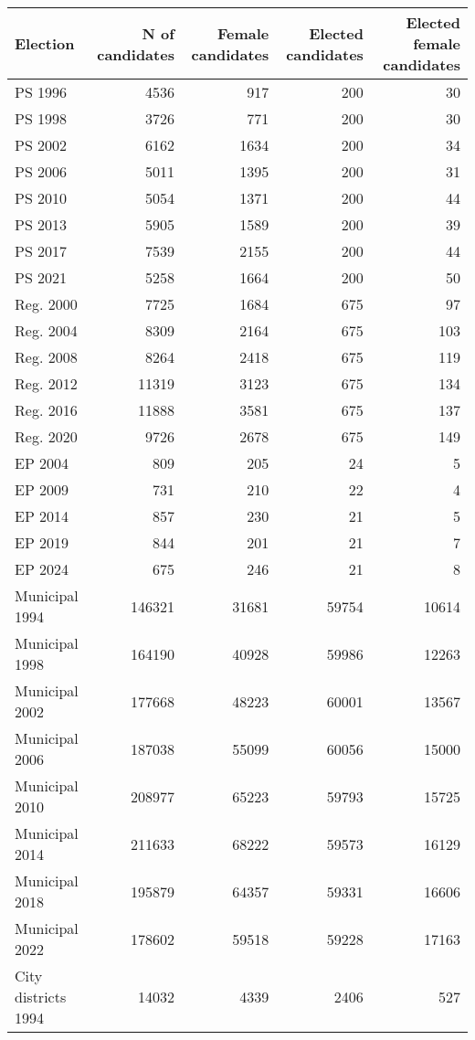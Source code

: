 
\begin{tabular}{l|r|r|r|r}
\hline
Election & N of candidates & Female candidates & Elected candidates & Elected female candidates\\
\hline
PS 1996 & 4536 & 917 & 200 & 30\\
\hline
PS 1998 & 3726 & 771 & 200 & 30\\
\hline
PS 2002 & 6162 & 1634 & 200 & 34\\
\hline
PS 2006 & 5011 & 1395 & 200 & 31\\
\hline
PS 2010 & 5054 & 1371 & 200 & 44\\
\hline
PS 2013 & 5905 & 1589 & 200 & 39\\
\hline
PS 2017 & 7539 & 2155 & 200 & 44\\
\hline
PS 2021 & 5258 & 1664 & 200 & 50\\
\hline
Reg. 2000 & 7725 & 1684 & 675 & 97\\
\hline
Reg. 2004 & 8309 & 2164 & 675 & 103\\
\hline
Reg. 2008 & 8264 & 2418 & 675 & 119\\
\hline
Reg. 2012 & 11319 & 3123 & 675 & 134\\
\hline
Reg. 2016 & 11888 & 3581 & 675 & 137\\
\hline
Reg. 2020 & 9726 & 2678 & 675 & 149\\
\hline
EP 2004 & 809 & 205 & 24 & 5\\
\hline
EP 2009 & 731 & 210 & 22 & 4\\
\hline
EP 2014 & 857 & 230 & 21 & 5\\
\hline
EP 2019 & 844 & 201 & 21 & 7\\
\hline
EP 2024 & 675 & 246 & 21 & 8\\
\hline
Municipal 1994 & 146321 & 31681 & 59754 & 10614\\
\hline
Municipal 1998 & 164190 & 40928 & 59986 & 12263\\
\hline
Municipal 2002 & 177668 & 48223 & 60001 & 13567\\
\hline
Municipal 2006 & 187038 & 55099 & 60056 & 15000\\
\hline
Municipal 2010 & 208977 & 65223 & 59793 & 15725\\
\hline
Municipal 2014 & 211633 & 68222 & 59573 & 16129\\
\hline
Municipal 2018 & 195879 & 64357 & 59331 & 16606\\
\hline
Municipal 2022 & 178602 & 59518 & 59228 & 17163\\
\hline
City districts 1994 & 14032 & 4339 & 2406 & 527\\

\end{tabular}
